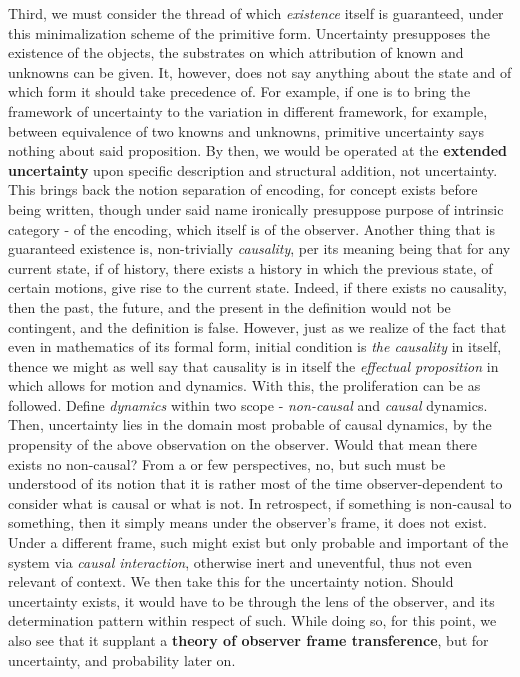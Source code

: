 Third, we must consider the thread of which \textit{existence} itself is guaranteed, under this minimalization scheme of the primitive form. Uncertainty presupposes the existence of the objects, the substrates on which attribution of known and unknowns can be given. It, however, does not say anything about the state and of which form it should take precedence of. For example, if one is to bring the framework of uncertainty to the variation in different framework, for example, between equivalence of two knowns and unknowns, primitive uncertainty says nothing about said proposition. By then, we would be operated at the \textbf{extended uncertainty} upon specific description and structural addition, not uncertainty. This brings back the notion separation of encoding, for concept exists before being written, though under said name ironically presuppose purpose of intrinsic category - of the encoding, which itself is of the observer. Another thing that is guaranteed existence is, non-trivially \textit{causality}, per its meaning being that for any current state, if of history, there exists a history in which the previous state, of certain motions, give rise to the current state. Indeed, if there exists no causality, then the past, the future, and the present in the definition would not be contingent, and the definition is false. However, just as we realize of the fact that even in mathematics of its formal form, initial condition is \textit{the causality} in itself, thence we might as well say that causality is in itself the \textit{effectual proposition} in which allows for motion and dynamics. With this, the proliferation can be as followed. Define \textit{dynamics} within two scope - \textit{non-causal} and \textit{causal} dynamics. Then, uncertainty lies in the domain most probable of causal dynamics, by the propensity of the above observation on the observer. Would that mean there exists no non-causal? From a or few perspectives, no, but such must be understood of its notion that it is rather most of the time observer-dependent to consider what is causal or what is not. In retrospect, if something is non-causal to something, then it simply means under the observer's frame, it does not exist. Under a different frame, such might exist but only probable and important of the system via \textit{causal interaction}, otherwise inert and uneventful, thus not even relevant of context. We then take this for the uncertainty notion. Should uncertainty exists, it would have to be through the lens of the observer, and its determination pattern within respect of such. While doing so, for this point, we also see that it supplant a \textbf{theory of observer frame transference}, but for uncertainty, and probability later on.


